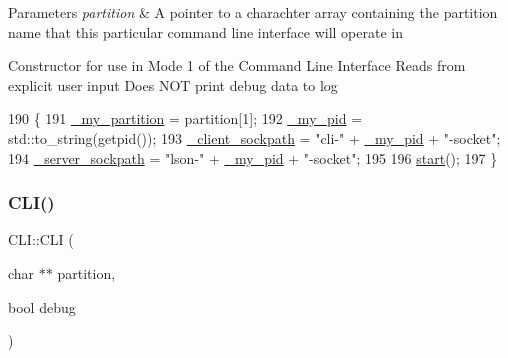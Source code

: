 \begin{DoxyParams}{Parameters}
{\em partition} & A pointer to a charachter array containing the partition name that this particular command line interface will operate in\\
\hline
\end{DoxyParams}
Constructor for use in Mode 1 of the Command Line Interface Reads from explicit user input Does N\+OT print debug data to log 
\begin{DoxyCode}
190 \{
191   \mbox{\hyperlink{class_c_l_i_aa58101a66621f7b2b64d4e566ad7bd89}{\_my\_partition}} = partition[1];
192   \mbox{\hyperlink{class_c_l_i_a589aa7edb9b2454720d5b54af3ddea00}{\_my\_pid}} = std::to\_string(getpid());
193   \mbox{\hyperlink{class_c_l_i_ad3b7579608f8c2e1d4c01a8668f701d9}{\_client\_sockpath}} = \textcolor{stringliteral}{"cli-"} + \mbox{\hyperlink{class_c_l_i_a589aa7edb9b2454720d5b54af3ddea00}{\_my\_pid}} + \textcolor{stringliteral}{"-socket"};
194   \mbox{\hyperlink{class_c_l_i_a582f907a9e5dc5c0dcd264e2f1b14f76}{\_server\_sockpath}} = \textcolor{stringliteral}{"lson-"} + \mbox{\hyperlink{class_c_l_i_a589aa7edb9b2454720d5b54af3ddea00}{\_my\_pid}} + \textcolor{stringliteral}{"-socket"};
195 
196   \mbox{\hyperlink{class_c_l_i_a1492005f186392031bd4d447cb20e975}{start}}();
197 \}
\end{DoxyCode}
\mbox{\label{class_c_l_i_aeafaa56f2b2d8c97121ed52125e3fa9a}} 
\subsubsection{\texorpdfstring{C\+L\+I()}{CLI()}\hspace{0.1cm}{\footnotesize\ttfamily [2/4]}}
{\footnotesize\ttfamily C\+L\+I\+::\+C\+LI (\begin{DoxyParamCaption}\item[{char $\ast$$\ast$}]{partition,  }\item[{bool}]{debug }\end{DoxyParamCaption})}


